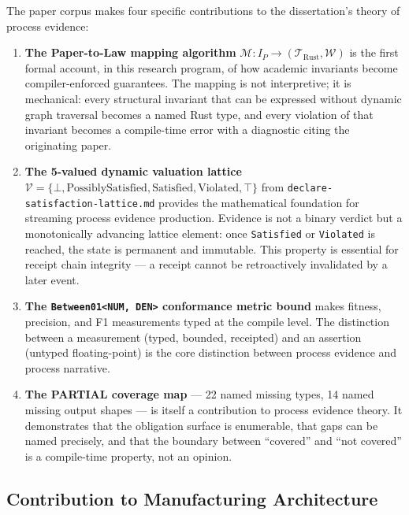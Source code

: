 The paper corpus makes four specific contributions to the dissertation's theory
of process evidence:

\begin{enumerate}
  \item \textbf{The Paper-to-Law mapping algorithm} $\mathcal{M}: I_P \to
    (\mathcal{T}_{\text{Rust}}, \mathcal{W})$ is the first formal account, in
    this research program, of how academic invariants become compiler-enforced
    guarantees. The mapping is not interpretive; it is mechanical: every
    structural invariant that can be expressed without dynamic graph traversal
    becomes a named Rust type, and every violation of that invariant becomes a
    compile-time error with a diagnostic citing the originating paper.

  \item \textbf{The 5-valued dynamic valuation lattice}
    $\mathcal{V} = \{\bot, \text{PossiblySatisfied}, \text{Satisfied},
    \text{Violated}, \top\}$ from \texttt{declare-satisfaction-lattice.md}
    provides the mathematical foundation for streaming process evidence
    production. Evidence is not a binary verdict but a monotonically advancing
    lattice element: once \texttt{Satisfied} or \texttt{Violated} is reached,
    the state is permanent and immutable. This property is essential for receipt
    chain integrity --- a receipt cannot be retroactively invalidated by a later
    event.

  \item \textbf{The \texttt{Between01<NUM, DEN>} conformance metric bound}
    makes fitness, precision, and F1 measurements typed at the compile level.
    The distinction between a measurement (typed, bounded, receipted) and an
    assertion (untyped floating-point) is the core distinction between process
    evidence and process narrative.

  \item \textbf{The PARTIAL coverage map} --- 22 named missing types, 14 named
    missing output shapes --- is itself a contribution to process evidence
    theory. It demonstrates that the obligation surface is enumerable, that
    gaps can be named precisely, and that the boundary between ``covered'' and
    ``not covered'' is a compile-time property, not an opinion.
\end{enumerate}

\subsection{Contribution to Manufacturing Architecture}
\label{sec:sources-papers-contribution-manufacturing}

